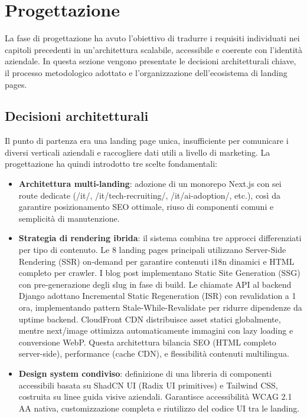 \chapter{Progettazione}

La fase di progettazione ha avuto l'obiettivo di tradurre i requisiti individuati
nei capitoli precedenti in un'architettura scalabile, accessibile e coerente con
l'identità aziendale. In questa sezione vengono presentate le decisioni
architetturali chiave, il processo metodologico adottato e l'organizzazione
dell'ecosistema di landing pages.

\section{Decisioni architetturali}
Il punto di partenza era una landing page unica, insufficiente per comunicare i
diversi verticali aziendali e raccogliere dati utili a livello di marketing. La
progettazione ha quindi introdotto tre scelte fondamentali:

\begin{itemize}
  \item \textbf{Architettura multi-landing}: adozione di un monorepo Next.js con sei
  route dedicate (/it/, /it/tech-recruiting/, /it/ai-adoption/, etc.), così da garantire 
  posizionamento SEO ottimale, riuso di componenti comuni e semplicità di manutenzione. 
  
  \item \textbf{Strategia di rendering ibrida}: il sistema combina tre approcci 
  differenziati per tipo di contenuto. Le 8 landing pages principali utilizzano 
  Server-Side Rendering (SSR) on-demand per garantire contenuti i18n dinamici e 
  HTML completo per crawler. I blog post implementano Static Site Generation (SSG) 
  con pre-generazione degli slug in fase di build. Le chiamate API al backend Django 
  adottano Incremental Static Regeneration (ISR) con revalidation a 1 ora, 
  implementando pattern Stale-While-Revalidate per ridurre dipendenze da uptime 
  backend. CloudFront CDN distribuisce asset statici globalmente, mentre next/image 
  ottimizza automaticamente immagini con lazy loading e conversione WebP. Questa 
  architettura bilancia SEO (HTML completo server-side), performance (cache CDN), 
  e flessibilità contenuti multilingua.
  
  \item \textbf{Design system condiviso}: definizione di una libreria di componenti 
  accessibili basata su ShadCN UI (Radix UI primitives) e Tailwind CSS, costruita 
  su linee guida visive aziendali. Garantisce accessibilità WCAG 2.1 AA nativa, 
  customizzazione completa e riutilizzo del codice UI tra le landing.
\end{itemize}

